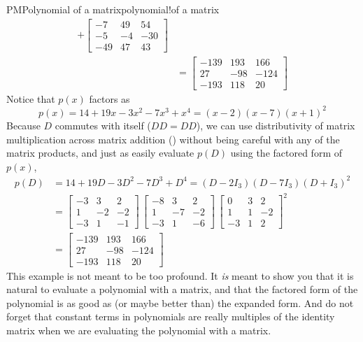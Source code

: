 \begin{example}{PM}{Polynomial of a matrix}{polynomial!of a matrix}
\begin{align*}
    +\begin{bmatrix}-7 & 49 & 54\\-5 & -4 & -30\\-49 & 47 & 43\end{bmatrix}\\
&=
\begin{bmatrix}
-139 & 193 & 166\\ 
27 & -98 & -124\\ 
-193 & 118 & 20
\end{bmatrix}
\end{align*}
%
Notice that $p(x)$ factors as
%
\begin{equation*}
p(x)=14+19x-3x^2-7x^3+x^4=(x-2)(x-7)(x+1)^2
\end{equation*}
%
Because $D$ commutes with itself ($DD=DD$), we can use distributivity of matrix multiplication across matrix addition () without being careful with any of the matrix products, and just as easily evaluate $p(D)$ using the factored form of $p(x)$,
%
\begin{align*}
p(D)&=14+19D-3D^2-7D^3+D^4=(D-2I_3)(D-7I_3)(D+I_3)^2\\
&=
\begin{bmatrix}
-3 & 3 & 2\\ 1 & -2 & -2\\ -3 & 1 & -1
\end{bmatrix}\,
\begin{bmatrix}
-8 & 3 & 2\\ 1 & -7 & -2\\ -3 & 1 & -6
\end{bmatrix}\,
\begin{bmatrix}
0 & 3 & 2\\ 1 & 1 & -2\\ -3 & 1 & 2
\end{bmatrix}^2\\
&=
\begin{bmatrix}
-139 & 193 & 166\\ 
27 & -98 & -124\\ 
-193 & 118 & 20
\end{bmatrix}
%
\end{align*}
%
This example is not meant to be too profound.  It {\em is} meant to show you that it is natural to evaluate a polynomial with a matrix, and that the factored form of the polynomial is as good as (or maybe better than) the expanded form.  And do not forget that constant terms in polynomials are really multiples of the identity matrix when we are evaluating the polynomial with a matrix.
%
\end{example}
